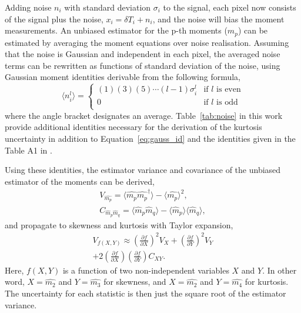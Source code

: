 \documentclass[fleqn,usenatbib]{mnras}
\begin{document}
Adding noise $n_i$ with standard deviation $\sigma_i$ to the signal, each pixel now consists of the signal plus the noise, $x_i = \delta T_i + n_i$, and the noise will bias the moment measurements. An unbiased estimator for the p-th moments ($\hat{m}_p$) can be estimated by averaging the moment equations over noise realisation. Assuming that the noise is Gaussian and independent in each pixel, the averaged noise terms can be rewritten as functions of standard deviation of the noise, using Gaussian moment identities derivable from the following formula,
\begin{equation}\label{eq:gauss_id}
    \langle n_i^l \rangle = 
    \begin{cases}
    (1)(3)(5)\dotsm(l-1)\sigma_i^l & \text{if } l \text{ is even}\\
    0  & \text{if } l \text{ is odd}\\
    \end{cases}
\end{equation}
where the angle bracket designates an average. Table~\ref{tab:noise} in this work provide additional identities necessary for the derivation of the kurtosis uncertainty in addition to Equation~\ref{eq:gauss_id} and the identities given in the Table A1 in \citet{Watkinson:2014jv}.

Using these identities, the estimator variance and covariance of the unbiased estimator of the moments can be derived,
\begin{gather}
    V_{\hat{m_p}} = \langle\hat{m_p}\hat{m_p}^{\dagger}\rangle 
        - \langle\hat{m_p}\rangle^2, \label{eq:estimator_variance}\\
    C_{\hat{m}_p\hat{m}_q} = \langle\hat{m}_p\hat{m}_q\rangle 
        - \langle\hat{m}_p\rangle\langle\hat{m}_q\rangle,
\end{gather}
and propagate to skewness and kurtosis with Taylor expansion,
\begin{equation}\label{eq:taylor}
\begin{split}
    V_{f(X,Y)} \approx 
    \left(\frac{\partial f}{\partial X}\right)^2 
    V_{X}
    + \left(\frac{\partial f}{\partial Y}\right)^2
    V_{Y} \\
    + 2 \left(\frac{\partial f}{\partial X}\right) 
    \left(\frac{\partial f}{\partial Y}\right)
    C_{X Y}.
\end{split}
\end{equation}
Here, $f(X,Y)$ is a function of two non-independent variables $X$ and $Y$. In other word, $X=\hat{m_2}$ and $Y=\hat{m_3}$ for skewness, and $X=\hat{m_2}$ and $Y=\hat{m_4}$
for kurtosis. The uncertainty for each statistic is then just the square root of the estimator variance.
\end{document}
